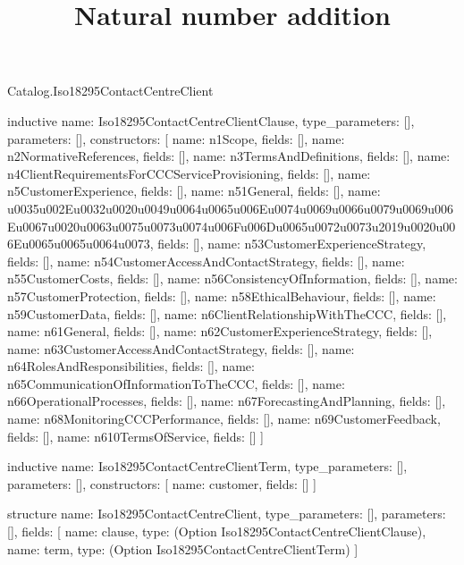 \begin{lexlean}{Catalog.Iso18295ContactCentreClient}
\title{Natural number addition}
\begin{semanticmodule}
inductive{
  name: Iso18295ContactCentreClientClause,
  type_parameters: [],
  parameters: [],
  constructors: [
    {name: n1Scope, fields: []},
    {name: n2NormativeReferences, fields: []},
    {name: n3TermsAndDefinitions, fields: []},
    {name: n4ClientRequirementsForCCCServiceProvisioning, fields: []},
    {name: n5CustomerExperience, fields: []},
    {name: n51General, fields: []},
    {name: u0035u002Eu0032u0020u0049u0064u0065u006Eu0074u0069u0066u0079u0069u006Eu0067u0020u0063u0075u0073u0074u006Fu006Du0065u0072u0073u2019u0020u006Eu0065u0065u0064u0073, fields: []},
    {name: n53CustomerExperienceStrategy, fields: []},
    {name: n54CustomerAccessAndContactStrategy, fields: []},
    {name: n55CustomerCosts, fields: []},
    {name: n56ConsistencyOfInformation, fields: []},
    {name: n57CustomerProtection, fields: []},
    {name: n58EthicalBehaviour, fields: []},
    {name: n59CustomerData, fields: []},
    {name: n6ClientRelationshipWithTheCCC, fields: []},
    {name: n61General, fields: []},
    {name: n62CustomerExperienceStrategy, fields: []},
    {name: n63CustomerAccessAndContactStrategy, fields: []},
    {name: n64RolesAndResponsibilities, fields: []},
    {name: n65CommunicationOfInformationToTheCCC, fields: []},
    {name: n66OperationalProcesses, fields: []},
    {name: n67ForecastingAndPlanning, fields: []},
    {name: n68MonitoringCCCPerformance, fields: []},
    {name: n69CustomerFeedback, fields: []},
    {name: n610TermsOfService, fields: []}
  ]
}

inductive{
  name: Iso18295ContactCentreClientTerm,
  type_parameters: [],
  parameters: [],
  constructors: [
    {name: customer, fields: []}
  ]
}

structure{
  name: Iso18295ContactCentreClient,
  type_parameters: [],
  parameters: [],
  fields: [
    {name: clause, type: (Option Iso18295ContactCentreClientClause)},
    {name: term, type: (Option Iso18295ContactCentreClientTerm)}
  ]
}
\end{semanticmodule}
\end{lexlean}

